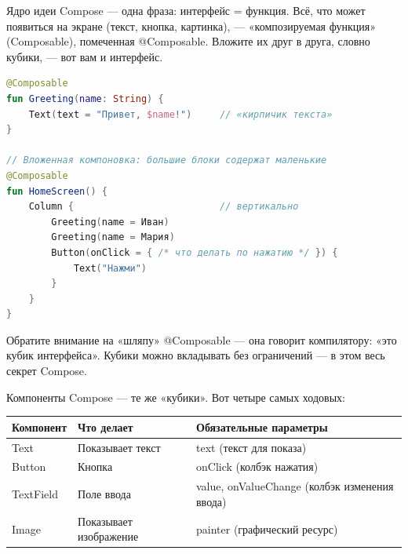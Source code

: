 


Ядро идеи Compose — одна фраза: интерфейс = функция. Всё, что может появиться на экране (текст, кнопка, картинка), — «композируемая функция» (Composable), помеченная @Composable. Вложите их друг в друга, словно кубики, — вот вам и интерфейс.

\begin{lstlisting}[language=Kotlin]
@Composable
fun Greeting(name: String) {
    Text(text = "Привет, $name!")     // «кирпичик текста»
}

// Вложенная компоновка: большие блоки содержат маленькие
@Composable
fun HomeScreen() {
    Column {                          // вертикально
        Greeting(name = Иван)
        Greeting(name = Мария)
        Button(onClick = { /* что делать по нажатию */ }) {
            Text("Нажми")
        }
    }
}
\end{lstlisting}

Обратите внимание на «шляпу» @Composable — она говорит компилятору: «это кубик интерфейса». Кубики можно вкладывать без ограничений — в этом весь секрет Compose.


Компоненты Compose — те же «кубики». Вот четыре самых ходовых:

\begin{center}
\begin{tabularx}{\linewidth}{|X|X|X|}
\hline
\textbf{Компонент} & \textbf{Что делает} & \textbf{Обязательные параметры} \tabularnewline
\hline
Text & Показывает текст & text (текст для показа) \tabularnewline
Button & Кнопка & onClick (колбэк нажатия) \tabularnewline
TextField & Поле ввода & value, onValueChange (колбэк изменения ввода) \tabularnewline
Image & Показывает изображение & painter (графический ресурс) \tabularnewline
\hline
\end{tabularx}
\end{center}

